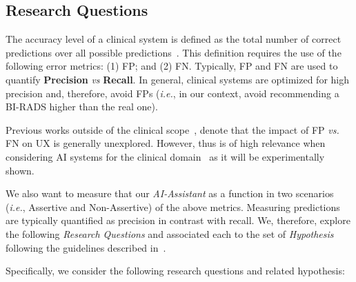 \subsection{Research Questions}
\label{sec:sec00305}

The accuracy level of a clinical system is defined as the total number of correct predictions over all possible predictions~\cite{seref2019performance}.
This definition requires the use of the following error metrics:
(1) FP; and
(2) FN.
Typically, FP and FN are used to quantify {\bf Precision} {\it vs} {\bf Recall}.
In general, clinical systems are optimized for high precision and, therefore, avoid FPs ({\it i.e.}, in our context, avoid recommending a BI-RADS higher than the real one).

Previous works outside of the clinical scope~\cite{Kocielnik:2019:YAI:3290605.3300641, Dove:2017:UDI:3025453.3025739}, denote that the impact of FP {\it vs.} FN on UX is generally unexplored.
However, thus is of high relevance when considering AI systems for the clinical domain~\cite{boughey2016identification, dialani2015role} as it will be experimentally shown.

We also want to measure that our \textit{AI-Assistant} as a function in two scenarios ({\it i.e.}, Assertive and Non-Assertive) of the above metrics.
Measuring predictions are typically quantified as precision in contrast with recall.
We, therefore, explore the following {\it Research Questions} and associated each to the set of {\it Hypothesis} following the guidelines described in~\cite{10.1145/3290605.3300233, Kocielnik:2019:YAI:3290605.3300641}.

\hfill

\noindent
Specifically, we consider the following research questions and related hypothesis:

